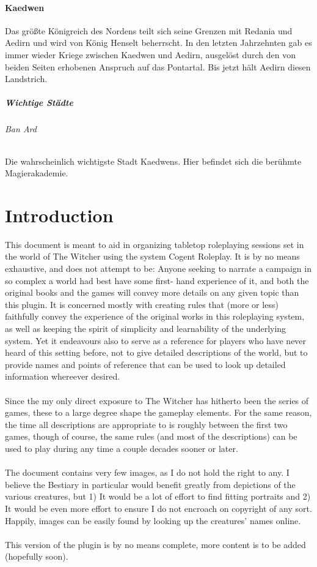 \documentclass[parskip=full,11pt]{scrreport}
\begin{document}
	\subsubsection{Kaedwen}
	Das größte Königreich des Nordens teilt sich seine Grenzen mit Redania und Aedirn und wird von König Henselt beherrscht. In den letzten Jahrzehnten gab es immer wieder Kriege zwischen Kaedwen und Aedirn, ausgelöst durch den von beiden Seiten erhobenen Anspruch auf das Pontartal. Bis jetzt hält Aedirn diesen Landstrich.
	\paragraph{Wichtige Städte}
	\subparagraph{Ban Ard}
	Die wahrscheinlich wichtigste Stadt Kaedwens. Hier befindet sich die berühmte Magierakademie.
\fi

\chapter*{Introduction}
This document is meant to aid in organizing tabletop roleplaying sessions set in the world of The Witcher using the system Cogent Roleplay.
It is by no means exhaustive, and does not attempt to be: Anyone seeking to narrate a campaign in so complex a world had best have some first-
hand experience of it, and both the original books and the games will convey more details on any given topic than this plugin. It is concerned
mostly with creating rules that (more or less) faithfully convey the experience of the original works in this roleplaying system, as well as
keeping the spirit of simplicity and learnability of the underlying system. Yet it
endeavours also to serve as a reference for players who have never heard of this setting before, not to give detailed descriptions of the world,
but to provide names and points of reference that can be used to look up detailed information whereever desired.
\\\\
Since the my only direct exposure to The Witcher has hitherto been the series of games, these to a large degree shape the gameplay elements.
For the same reason, the time all descriptions are appropriate to is roughly between the first two games, though of course, the same rules (and
most of the descriptions) can be used to play during any time a couple decades sooner or later.
\\\\
The document contains very few images, as I do not hold the right to any. I believe the Bestiary in particular would benefit greatly
from depictions of the various creatures, but 1) It would be a lot of effort to find fitting portraits and 2) It would be even more effort to
ensure I do not encroach on copyright of any sort. Happily, images can be easily found by looking up the creatures' names online.
\\\\
This version of the plugin is by no means complete, more content is to be added (hopefully soon).
\end{document}
